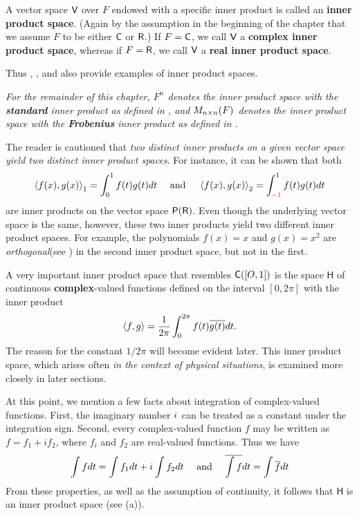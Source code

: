 \begin{remark} \label{remark 6.1.6}
A vector space \(\textsf{V}\) over \(F\) endowed with a specific inner product is called an \textbf{inner product space}.
(Again by the assumption in the beginning of the chapter that we assume \(F\) to be either \(\textsf{C}\) or \(\textsf{R}\).)
If \(F = \textsf{C}\), we call \(\textsf{V}\) a \textbf{complex inner product space}, whereas if \(F = \textsf{R}\), we call \(\textsf{V}\) a \textbf{real inner product space}.

Thus , , and  also provide examples of inner product spaces.
\begin{center}\emph{
    For the remainder of this chapter, \(F^n\) denotes the inner product space with the \textbf{standard} inner product as defined in , and \(M_{n \times n}(F)\) denotes the inner product space with the \textbf{Frobenius} inner product as defined in .
}\end{center}
\end{remark}

\begin{remark} \label{remark 6.1.7}
The reader is cautioned that \emph{two distinct inner products on a given vector space yield two distinct inner product spaces}.
For instance, it can be shown that both
\[
    \LG f(x), g(x) \RG_1 = \int_0^1 f(t) g(t) d t
    \quad \text { and } \quad
    \LG f(x), g(x) \RG_{2} = \int_{\RED{-1}}^{1} f(t) g(t) d t
\]
are inner products on the vector space \(\textsf{P}(\textsf{R})\).
Even though the underlying vector space is the same, however, these two inner products yield two different inner product spaces.
For example, the polynomials \(f(x) = x\) and \(g(x) = x^2\) are \emph{orthogonal}(see ) in the second inner product space, but not in the first.
\end{remark}

\begin{remark} \label{remark 6.1.8}
A very important inner product space that resembles \(\textsf{C}([O, 1])\) is the space \(\textsf{H}\) of continuous \textbf{complex}-valued functions defined on the interval \([0, 2\pi]\) with the inner product
\[
    \left< f, g \right> = \frac{1}{2\pi} \int_0^{2\pi} f(t) \overline{g(t)} dt.
\]
The reason for the constant \(1/2\pi\) will become evident later.
This inner product space, which arises often \emph{in the context of physical situations}, is examined
more closely in later sections.

At this point, we mention a few facts about integration of complex-valued functions.
First, the imaginary number \({i\mkern1mu}\) can be treated as a constant under the integration sign.
Second, every complex-valued function \(f\) may be written as \(f = f_1 + i f_2\), where \(f_i\) and \(f_2\) are real-valued functions.
Thus we have
\[
    \int f dt = \int f_1 dt + {i\mkern1mu} \int f_2 dt \quad \text{ and } \quad \overline{\int f} dt = \int \overline{f} dt
\]
From these properties, as well as the assumption of continuity, it follows that \(\textsf{H}\) is an inner product space (see (a)).
\end{remark}

